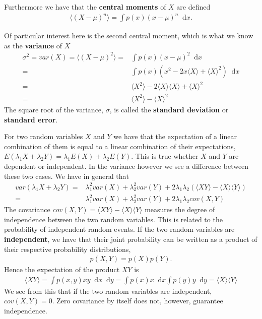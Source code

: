 \documentclass[twoside,english]{uiofysmaster}
\newcommand*\dif{\mathop{}\!\mathrm{d}}
\begin{document}
Furthermore we have that the \textbf{central moments} of $X$ are defined
\begin{align}
	\langle (X-\mu)^n \rangle = \int p(x) (x - \mu)^n \dif x .
\end{align}

Of particular interest here is the second central moment, which is what we know as the \textbf{variance} of $X$
\begin{align}
	\sigma^2 = var(X) = \langle (X-\mu)^2 \rangle =& \int p(x) (x - \mu)^2 \dif x  \\
	=& \int p(x) (x^2 - 2x \langle X \rangle + \langle X \rangle^2) \dif x \\
	=& \langle X^2 \rangle - 2\langle X \rangle \langle X \rangle + \langle X \rangle^2  \\
	=& \langle X^2 \rangle - \langle X \rangle^2
\end{align}
The square root of the variance, $\sigma$, is called the \textbf{standard deviation} or \textbf{standard error}. 

For two random variables $X$ and $Y$ we have that the expectation of a linear combination of them is equal to a linear combination of their expectations, $E(\lambda_1 X + \lambda_2 Y) = \lambda_1 E(X) + \lambda_2 E(Y)$. This is true whether $X$ and $Y$ are dependent or independent. In the variance however we see a difference between these two cases. We have in general that
\begin{align}
	var(\lambda_1 X + \lambda_2 Y) =& \lambda_1^2 var(X) + \lambda_2^2 var(Y) + 2 \lambda_1 \lambda_2 ( \langle XY \rangle
	- \langle X \rangle \langle Y \rangle) \\
	=& \lambda_1^2 var(X) + \lambda_2^2 var(Y) + 2 \lambda_1 \lambda_2 cov (X, Y)
\end{align}
The covariance $cov(X, Y) = \langle XY \rangle	- \langle X \rangle \langle Y \rangle$ measures the degree of independence between the two random variables. This is related to the probability of independent random events. If the two random variables are \textbf{independent}, we have that their joint probability can be written as a product of their respective probability distributions,
\begin{align}
	p(X, Y) = p(X) p(Y) .
\end{align}
Hence the expectation of the product $XY$ is
\begin{align}
	\langle XY \rangle = \int p(x, y) xy \dif x \dif y = \int p(x) x \dif x \int p(y) y \dif y
	=\langle X \rangle \langle Y \rangle
\end{align}
We see from this that if the two random variables are independent, $cov(X,Y) = 0$. Zero covariance by itself does not, however, guarantee independence.
\end{document}
